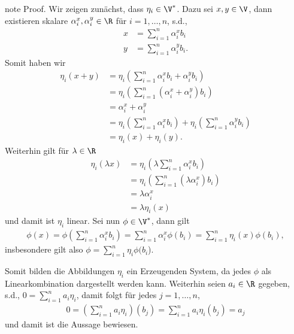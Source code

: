 \documentclass[letterpaper,10pt,english]{jupyterBook}
\begin{document}
\begin{sphinxadmonition}{note}
\sphinxAtStartPar
Proof. Wir zeigen zunächst, dass \(\eta_i\in\V^\ast\). Dazu sei \(x,y\in\V\), dann existieren skalare
\(\alpha_i^x,\alpha_i^y\in\R\) für \(i=1,\ldots,n\), s.d.,
\begin{equation*}
\begin{split}x &= \sum_{i=1}^n \alpha_i^x b_i\\
y &= \sum_{i=1}^n \alpha_i^y b_i.\end{split}
\end{equation*}
\sphinxAtStartPar
Somit haben wir
\begin{equation*}
\begin{split}\eta_i(x+y) &= \eta_i\left(\sum_{i=1}^n \alpha_i^x b_i + \alpha_i^y b_i\right) 
\\&=
\eta_i\left(\sum_{i=1}^n (\alpha_i^x + \alpha_i^y) b_i\right) 
\\&=
\alpha_i^x + \alpha_i^y
\\&=
\eta_i\left(\sum_{i=1}^n \alpha_i^x b_i\right)  + \eta_i\left(\sum_{i=1}^n \alpha_i^y b_i\right)
\\&=
\eta_i(x) + \eta_i(y).\end{split}
\end{equation*}
\sphinxAtStartPar
Weiterhin gilt für \(\lambda\in\R\)
\begin{equation*}
\begin{split}\eta_i(\lambda x) &= \eta_i\left(\lambda \sum_{i=1}^n \alpha_i^x b_i\right) 
\\&=
\eta_i\left(\sum_{i=1}^n (\lambda \alpha_i^x) b_i\right) 
\\&=
\lambda \alpha_i^x
\\&=
\lambda \eta_i(x)\end{split}
\end{equation*}
\sphinxAtStartPar
und damit ist \(\eta_i\) linear.
Sei nun \(\phi\in\V^\ast\), dann gilt
\begin{equation*}
\begin{split}\phi(x) = \phi\left(\sum_{i=1}^n \alpha_i^x b_i\right) = \sum_{i=1}^n \alpha_i^x \phi(b_i) = 
\sum_{i=1}^n \eta_i(x) \phi(b_i),\end{split}
\end{equation*}
\sphinxAtStartPar
insbesondere gilt also \(\phi = \sum_{i=1}^n \eta_i \phi(b_i\)).

\sphinxAtStartPar
Somit bilden die Abbildungen \(\eta_i\) ein Erzeugenden System, da jedes \(\phi\) als Linearkombination dargestellt werden kann.
Weiterhin seien \(a_i\in\R\) gegeben, s.d., \(0 = \sum_{i=1}^n a_i \eta_i\), damit folgt für jedes \(j=1,\ldots,n\),
\begin{equation*}
\begin{split}0 = \left(\sum_{i=1}^n a_i \eta_i\right)(b_j) = \sum_{i=1}^n a_i \eta_i(b_j) = a_j\end{split}
\end{equation*}
\sphinxAtStartPar
und damit ist die Aussage bewiesen.
\end{sphinxadmonition}
\end{document}
